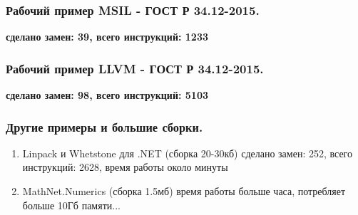 \documentclass[10pt]{beamer}
\begin{document}
%
\begin{frame}
\frametitle{Рабочий пример MSIL - ГОСТ Р 34.12-2015. }
\textbf{сделано замен: 39,
всего инструкций: 1233}
\end{frame}

%
\begin{frame}
\frametitle{Рабочий пример LLVM - ГОСТ Р 34.12-2015. }
\textbf{сделано замен: 98,
всего инструкций: 5103}
%
\end{frame}

\usebackgroundtemplate{}%
\begin{frame}
\frametitle{Другие примеры и большие сборки. }
\begin{enumerate}
  \item Linpack и Whetstone для .NET (сборка 20-30кб)
     сделано замен: 252,
     всего инструкций: 2628,
     время работы около минуты 
  \item MathNet.Numerics (сборка 1.5мб)
     время работы больше часа, потребляет больше 10Гб памяти...
\end{enumerate}
\end{frame}
\end{document}
